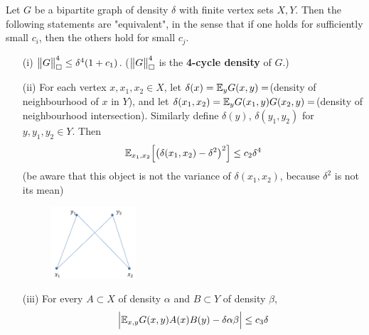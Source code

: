 \documentclass[10pt,a4paper]{report}
\begin{document}
 Let $G$ be a bipartite graph of density $\delta$ with finite vertex sets $X,Y$. Then the following statements are "equivalent", in the sense that if one holds for sufficiently small $c_i$, then the others hold for small $c_j$.
\begin{itemize}
\item[(i)] $\bigl\lVert G\bigr\rVert_{\tiny{\square}}^4 \leq \delta^4 (1+c_1)$. ($\bigl\lVert G\bigr\rVert_{\tiny{\square}}^4$ is the \textbf{4-cycle density} of $G$.)
\item[(ii)] For each vertex $x,x_1, x_2 \in X$, let $\delta(x) = \mathbb{E}_y G(x,y) =$(density of neighbourhood of $x$ in $Y$), and let $\delta(x_1,x_2) = \mathbb{E}_y G(x_1,y)G(x_2,y)=$(density of neighbourhood intersection). Similarly define $\delta(y)$, $\delta(y_1,y_2)$ for $y,y_1,y_2 \in Y$. Then
\begin{align*}
\mathbb{E}_{x_1,x_2} \Big[ \big( \delta(x_1,x_2) - \delta^2 \big)^2 \Big] \leq c_2 \delta^4
\end{align*}
(be aware that this object is not the variance of $\delta(x_1,x_2)$, because $\delta^2$ is not its mean)
\begin{figure}[h]
	\centering
	\includegraphics[width=0.3\textwidth]{2}
\end{figure}
\item[(iii)] For every $A \subset X$ of density $\alpha$ and $B\subset Y$ of density $\beta$,
\begin{align*}
\Big| \mathbb{E}_{x,y} G(x,y) A(x)B(y) - \delta \alpha \beta \Big| \leq c_3 \delta
\end{align*}
\end{itemize}
\end{document}
